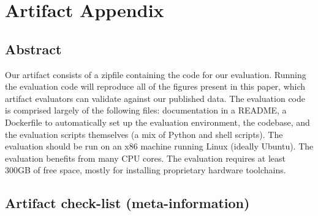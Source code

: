 %
%
%
%
%

\section{Artifact Appendix}

\subsection{Abstract}

Our artifact
  consists of a zipfile
  containing the code
  for our evaluation.
Running the evaluation code
  will reproduce all of the figures
  present in this paper,
  which artifact evaluators can
  validate against our published data.
The evaluation code
  is comprised largely of
  the following files:
  documentation in a README,
  a Dockerfile
  to automatically set up the 
  evaluation environment,
  the \lr codebase, and
  the evaluation scripts themselves
  (a mix of Python and shell scripts).
The evaluation
  should be run on an x86 machine
  running Linux (ideally Ubuntu).
The evaluation benefits from many CPU cores.
The evaluation requires at least 300GB
  of free space,
  mostly for installing proprietary hardware
  toolchains.
\tighten


\subsection{Artifact check-list (meta-information)}


